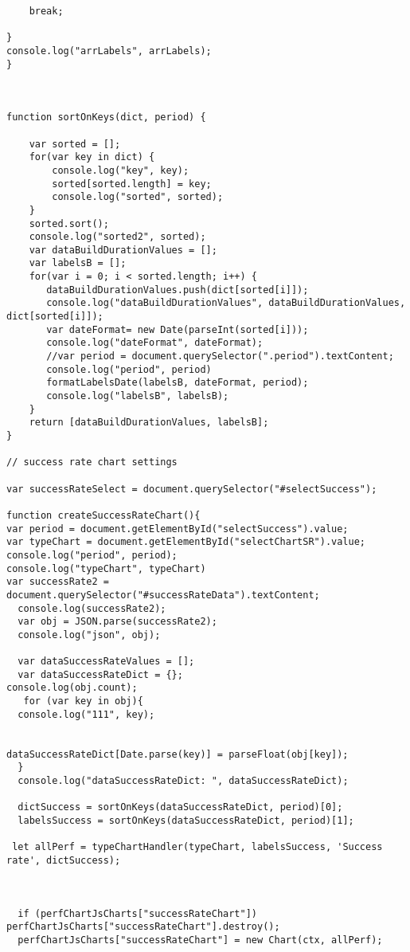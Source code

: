 \begin{lstlisting}
    break;

}
console.log("arrLabels", arrLabels);
}



function sortOnKeys(dict, period) {

    var sorted = [];
    for(var key in dict) {
        console.log("key", key);
        sorted[sorted.length] = key;
        console.log("sorted", sorted);
    }
    sorted.sort();
    console.log("sorted2", sorted);
    var dataBuildDurationValues = [];
    var labelsB = [];
    for(var i = 0; i < sorted.length; i++) {
       dataBuildDurationValues.push(dict[sorted[i]]);
       console.log("dataBuildDurationValues", dataBuildDurationValues, dict[sorted[i]]);
       var dateFormat= new Date(parseInt(sorted[i]));
       console.log("dateFormat", dateFormat);
       //var period = document.querySelector(".period").textContent;
       console.log("period", period)
       formatLabelsDate(labelsB, dateFormat, period);
       console.log("labelsB", labelsB);
    }
    return [dataBuildDurationValues, labelsB];
}

// success rate chart settings

var successRateSelect = document.querySelector("#selectSuccess");

function createSuccessRateChart(){
var period = document.getElementById("selectSuccess").value;
var typeChart = document.getElementById("selectChartSR").value;
console.log("period", period);
console.log("typeChart", typeChart)
var successRate2 = document.querySelector("#successRateData").textContent;
  console.log(successRate2);
  var obj = JSON.parse(successRate2);
  console.log("json", obj);

  var dataSuccessRateValues = [];
  var dataSuccessRateDict = {};
console.log(obj.count);
   for (var key in obj){
  console.log("111", key);


dataSuccessRateDict[Date.parse(key)] = parseFloat(obj[key]);
  }
  console.log("dataSuccessRateDict: ", dataSuccessRateDict);

  dictSuccess = sortOnKeys(dataSuccessRateDict, period)[0];
  labelsSuccess = sortOnKeys(dataSuccessRateDict, period)[1];

 let allPerf = typeChartHandler(typeChart, labelsSuccess, 'Success rate', dictSuccess);



  if (perfChartJsCharts["successRateChart"]) perfChartJsCharts["successRateChart"].destroy();
  perfChartJsCharts["successRateChart"] = new Chart(ctx, allPerf);


\end{lstlisting}
